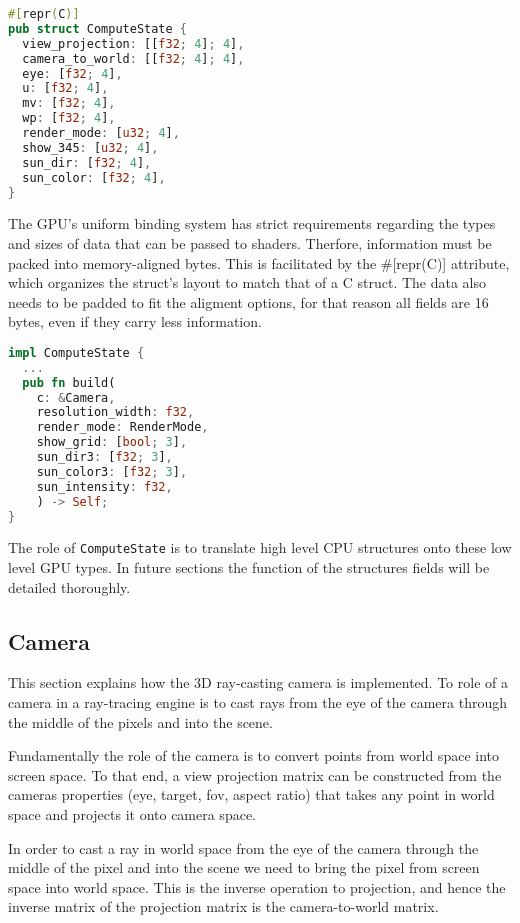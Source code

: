 \begin{lstlisting}[language=rust]
#[repr(C)]
pub struct ComputeState {
  view_projection: [[f32; 4]; 4],
  camera_to_world: [[f32; 4]; 4],
  eye: [f32; 4],
  u: [f32; 4],
  mv: [f32; 4],
  wp: [f32; 4],
  render_mode: [u32; 4],
  show_345: [u32; 4],
  sun_dir: [f32; 4],
  sun_color: [f32; 4],
}
\end{lstlisting}

The GPU's uniform binding system has strict requirements regarding the types and sizes of data that can be passed to shaders. Therfore, information must be packed into memory-aligned bytes. This is facilitated by the #[repr(C)] attribute, which organizes the struct's layout to match that of a C struct. The data also needs to be padded to fit the aligment options, for that reason all fields are 16 bytes, even if they carry less information.

\begin{lstlisting}[language=rust,caption={\texttt{ComputeState} build method that transforms CPU data into GPU-ready data},captionpos=b,
  label={cstate:build}]
impl ComputeState {
  ...
  pub fn build(
    c: &Camera,
    resolution_width: f32,
    render_mode: RenderMode,
    show_grid: [bool; 3],
    sun_dir3: [f32; 3],
    sun_color3: [f32; 3],
    sun_intensity: f32,
    ) -> Self;
}
\end{lstlisting}

The role of \verb|ComputeState| is to translate high level CPU structures onto these low level GPU types. In future sections the function of the structures fields will be detailed thoroughly.

\subsection{Camera}

This section explains how the 3D ray-casting camera is implemented. To role of a camera in a ray-tracing engine is to cast rays from the eye of the camera through the middle of the pixels and into the scene.

Fundamentally the role of the camera is to convert points from world space into screen space. To that end, a view projection matrix can be constructed from the cameras properties (eye, target, \acrshort{fov}, aspect ratio) that takes any point in world space and projects it onto camera space.

In order to cast a ray in world space from the eye of the camera through the middle of the pixel and into the scene we need to bring the pixel from screen space into world space. This is the inverse operation to projection, and hence the inverse matrix of the projection matrix is the camera-to-world matrix.


